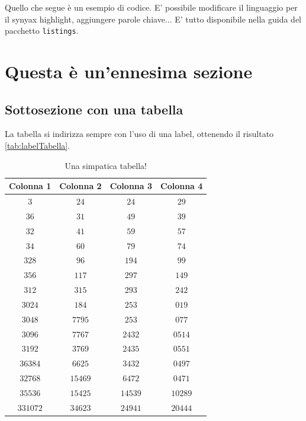 Quello che segue è un esempio di codice. E' possibile modificare il linguaggio per il synyax highlight, aggiungere parole chiave... E' tutto disponibile nella guida del pacchetto \texttt{listings}.

 

\section{Questa è un'ennesima sezione}

\lipsum[4]

\subsection{Sottosezione con una tabella}

La tabella si indirizza sempre con l'uso di una label, ottenendo il risultato \autoref{tab:labelTabella}.

\begin{table}
    \caption{Una simpatica tabella!}\label{tab:labelTabella}
    \begin{center}
    \begin{tabular}{c|c|c|c}
        \textbf{Colonna 1} & \textbf{Colonna 2} & \textbf{Colonna 3} & \textbf{Colonna 4} \\
        \hline
            $3$      & $24$     & $24$    & $29$ \\ 
            $36$     & $31$     & $49$    & $39$ \\ 
            $32$     & $41$     & $59$    & $57$ \\ 
            $34$     & $60$     & $79$    & $74$ \\ 
            $328$    & $96$     & $194$   & $99$ \\ 
            $356$    & $117$    & $297$   & $149$ \\ 
            $312$    & $315$    & $293$   & $242$ \\ 
            $3024$   & $184$    & $253$   & $019$ \\ 
            $3048$   & $7795$   & $253$   & $077$ \\ 
            $3096$   & $7767$   & $2432$  & $0514$ \\ 
            $3192$   & $3769$   & $2435$  & $0551$ \\ 
            $36384$  & $6625$   & $3432$  & $0497$ \\ 
            $32768$  & $15469$  & $6472$  & $0471$ \\ 
            $35536$  & $15425$  & $14539$ & $10289$ \\ 
            $331072$ & $34623$  & $24941$ & $20444$ \\  
        \end{tabular}
    \end{center}
\end{table}